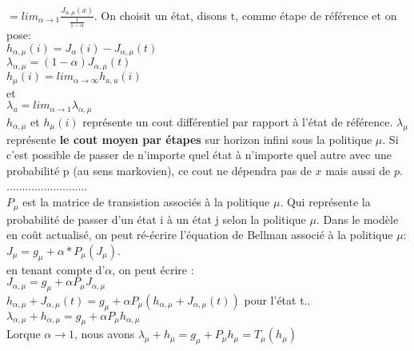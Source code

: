 \documentclass[oneside]{book}
\begin{document}
$= lim_{\alpha \rightarrow 1}\frac{J_{\alpha, \mu}(x)}{\frac{1}{1 - \alpha}}$. On choisit un état, disons t, comme étape de référence et on pose:\\

$h_{\alpha, \mu}(i) = J_{\alpha}(i) - J_{\alpha, \mu}(t)$\\
$\lambda_{\alpha, \mu} = (1-\alpha) J_{\alpha, \mu}(t)$\\
$h_{\mu}(i) = lim_{\alpha \rightarrow \infty}h_{a,u}(i)$\\
et\\
$\lambda_u = lim_{\alpha \rightarrow 1} \lambda_{\alpha, \mu}$\\


$h_{\alpha, \mu}$ et $h_{\mu}(i)$ représente un cout différentiel par rapport à l'état de référence. $\lambda_{\mu}$ représente \textbf{le cout moyen par étapes} sur horizon infini sous la politique $\mu$. Si c'est possible de passer de n'importe quel état à n'importe quel autre avec une probabilité p (au sens markovien), ce cout ne dépendra pas de $x$ mais aussi de $p$.\\



..........................\\

$P_{\mu}$ est  la matrice de transistion associés à la politique $\mu$. Qui représente la probabilité de passer d'un état i à un état j selon la politique $\mu$. Dans le modèle en coût actualisé, on peut ré-écrire l'équation de Bellman associé à la politique $\mu$:\\

$J_{\mu} = g_{\mu} + \alpha * P_{\mu}(J_{\mu})$.\\

en tenant compte d'$\alpha$, on peut écrire :\\

$J_{\alpha, \mu} = g_{\mu} + \alpha P_{\mu}J_{\alpha, \mu}$\\

$h_{\alpha, \mu} + J_{\alpha, \mu}(t) = g_{\mu} + \alpha P_{\mu}(h_{\alpha, \mu} + J_{\alpha, \mu}(t))$ pour l'état t..\\

$\lambda_{\alpha, \mu} + h_{\alpha, \mu} = g_{\mu} + \alpha P_{\mu}h_{\alpha, \mu}$\\

Lorque $\alpha \rightarrow 1$, nous avons $\lambda_{\mu} + h_{\mu} = g_{\mu} + P_{\mu}h_{\mu} = T_{\mu}(h_{\mu})$\\
\end{document}
